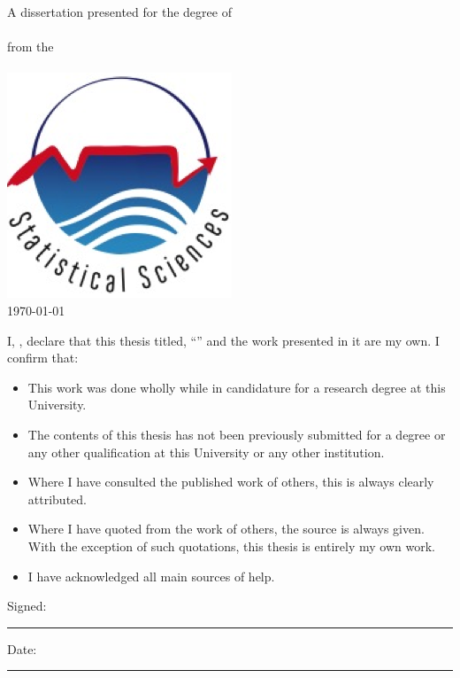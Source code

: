 \documentclass[
12pt, %
english, %
singlespacing, %
parskip, %
headsepline, %
openany,
]{MastersDoctoralThesis} %
\numberwithin{theorem}{section}
\numberwithin{remark}{section}
\numberwithin{assumption}{section}
\begin{document}
\begin{titlepage}
\begin{center}
\large {A dissertation presented for the degree of \\ \degreename \ }\\[0.3cm] %
{from the}\\[0.4cm]
\deptname\\[1cm] %
\includegraphics*[width=0.25\linewidth]{Figures/statslogo.png} \\[1cm]
{\large \today}\\[4cm] %
 
\vfill
\end{center}
\end{titlepage}



\begin{declaration}
\addchaptertocentry{\authorshipname} 
\vspace{1.5cm}

\noindent I, \authorname, declare that this thesis titled, \enquote{\ttitle} and the work presented in it are my own. I confirm that:

\begin{itemize} 
\item This work was done wholly while in candidature for a research degree at this University.
\item The contents of this thesis has not been previously submitted for a degree or any other qualification at this University or any other institution.
\item Where I have consulted the published work of others, this is always clearly attributed.
\item Where I have quoted from the work of others, the source is always given. With the exception of such quotations, this thesis is entirely my own work.
\item I have acknowledged all main sources of help.
\end{itemize}

\vspace{1cm}
\noindent Signed:\\
\rule[0.5em]{25em}{0.5pt} %
 
\noindent Date:\\
\rule[0.5em]{25em}{0.5pt} %
\end{declaration}
\end{document}
